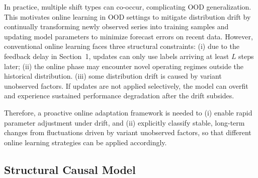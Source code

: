 ﻿\documentclass[journal]{IEEEtran}
\newenvironment{auditproblemblock}{\begingroup\color{red}}{\endgroup}
\begin{document}
\begin{auditproblemblock}
In practice, multiple shift types can co-occur, complicating OOD generalization. This motivates online learning in OOD settings to mitigate distribution drift by continually transforming newly observed series into training samples and updating model parameters to minimize forecast errors on recent data. However, conventional online learning faces three structural constraints: (i) due to the feedback delay in Section~1, updates can only use labels arriving at least $L$ steps later; (ii) the online phase may encounter novel operating regimes outside the historical distribution. (iii) some distribution drift is caused by variant unobserved factors. If updates are not applied selectively, the model can overfit and experience sustained performance degradation after the drift subsides. 

Therefore, a proactive online adaptation framework is needed to (i) enable rapid parameter adjustment under drift, and (ii) explicitly classify stable, long-term changes from fluctuations driven by variant unobserved factors, so that different online learning strategies can be applied accordingly.
\end{auditproblemblock}

\subsection{Structural Causal Model}
\end{document}
